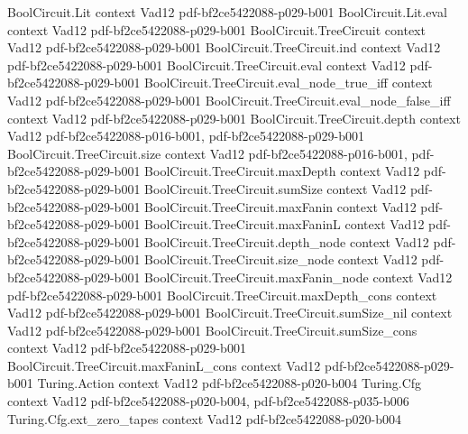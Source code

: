 \begin{theorem}
\label{Randomized.PITLang_le_ZEROP}
\leanok
\proofstep
  {BoolCircuit.Lit}
  {context}
  {Vad12}
  {pdf-bf2ce5422088-p029-b001}
\proofstep
  {BoolCircuit.Lit.eval}
  {context}
  {Vad12}
  {pdf-bf2ce5422088-p029-b001}
\proofstep
  {BoolCircuit.TreeCircuit}
  {context}
  {Vad12}
  {pdf-bf2ce5422088-p029-b001}
\proofstep
  {BoolCircuit.TreeCircuit.ind}
  {context}
  {Vad12}
  {pdf-bf2ce5422088-p029-b001}
\proofstep
  {BoolCircuit.TreeCircuit.eval}
  {context}
  {Vad12}
  {pdf-bf2ce5422088-p029-b001}
\proofstep
  {BoolCircuit.TreeCircuit.eval_node_true_iff}
  {context}
  {Vad12}
  {pdf-bf2ce5422088-p029-b001}
\proofstep
  {BoolCircuit.TreeCircuit.eval_node_false_iff}
  {context}
  {Vad12}
  {pdf-bf2ce5422088-p029-b001}
\proofstep
  {BoolCircuit.TreeCircuit.depth}
  {context}
  {Vad12}
  {pdf-bf2ce5422088-p016-b001,
    pdf-bf2ce5422088-p029-b001}
\proofstep
  {BoolCircuit.TreeCircuit.size}
  {context}
  {Vad12}
  {pdf-bf2ce5422088-p016-b001,
    pdf-bf2ce5422088-p029-b001}
\proofstep
  {BoolCircuit.TreeCircuit.maxDepth}
  {context}
  {Vad12}
  {pdf-bf2ce5422088-p029-b001}
\proofstep
  {BoolCircuit.TreeCircuit.sumSize}
  {context}
  {Vad12}
  {pdf-bf2ce5422088-p029-b001}
\proofstep
  {BoolCircuit.TreeCircuit.maxFanin}
  {context}
  {Vad12}
  {pdf-bf2ce5422088-p029-b001}
\proofstep
  {BoolCircuit.TreeCircuit.maxFaninL}
  {context}
  {Vad12}
  {pdf-bf2ce5422088-p029-b001}
\proofstep
  {BoolCircuit.TreeCircuit.depth_node}
  {context}
  {Vad12}
  {pdf-bf2ce5422088-p029-b001}
\proofstep
  {BoolCircuit.TreeCircuit.size_node}
  {context}
  {Vad12}
  {pdf-bf2ce5422088-p029-b001}
\proofstep
  {BoolCircuit.TreeCircuit.maxFanin_node}
  {context}
  {Vad12}
  {pdf-bf2ce5422088-p029-b001}
\proofstep
  {BoolCircuit.TreeCircuit.maxDepth_cons}
  {context}
  {Vad12}
  {pdf-bf2ce5422088-p029-b001}
\proofstep
  {BoolCircuit.TreeCircuit.sumSize_nil}
  {context}
  {Vad12}
  {pdf-bf2ce5422088-p029-b001}
\proofstep
  {BoolCircuit.TreeCircuit.sumSize_cons}
  {context}
  {Vad12}
  {pdf-bf2ce5422088-p029-b001}
\proofstep
  {BoolCircuit.TreeCircuit.maxFaninL_cons}
  {context}
  {Vad12}
  {pdf-bf2ce5422088-p029-b001}
\proofstep
  {Turing.Action}
  {context}
  {Vad12}
  {pdf-bf2ce5422088-p020-b004}
\proofstep
  {Turing.Cfg}
  {context}
  {Vad12}
  {pdf-bf2ce5422088-p020-b004,
    pdf-bf2ce5422088-p035-b006}
\proofstep
  {Turing.Cfg.ext_zero_tapes}
  {context}
  {Vad12}
  {pdf-bf2ce5422088-p020-b004}
\proofstep

\end{theorem}
